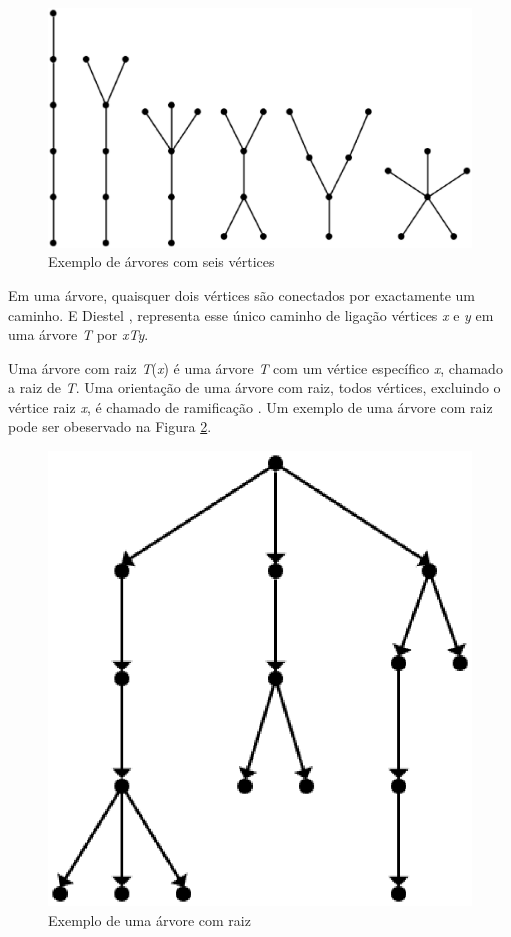 \begin{figure}[!h]
	\centering
	\includegraphics[scale=0.5]{figuras/capitulo1/arvores_seis_vertices.eps}
	\caption{Exemplo de árvores com seis vértices}
	\label{arvores_seis_vertices}
\end{figure}

Em uma árvore, quaisquer dois vértices são conectados por exactamente um caminho. E Diestel \cite{Diestel:1997}, representa esse único caminho de ligação vértices \textit{x} e \textit{y} em uma árvore \textit{T} por \textit{xTy}.

Uma árvore com raiz \textit{T}(\textit{x}) é uma árvore \textit{T} com um vértice específico \textit{x}, chamado a raiz de \textit{T}. Uma orientação de uma árvore com raiz, todos vértices, excluindo o vértice raiz \textit{x}, é chamado de ramificação \cite{Bondy:2007}. Um exemplo de uma árvore com raiz pode ser obeservado na Figura \ref{arvore_raiz}.

\begin{figure}[!h]
	\centering
	\includegraphics[scale=0.3]{figuras/capitulo1/arvore_raiz.eps}
	\caption{Exemplo de uma árvore com raiz}
	\label{arvore_raiz}
\end{figure}

